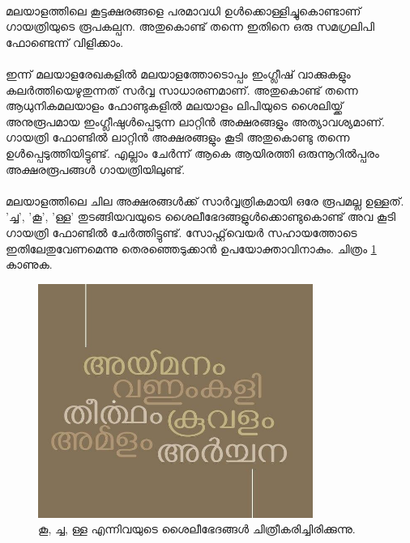 \documentclass[12pt]{report}
\begin{document}
	\paragraph{}
	മലയാളത്തിലെ കൂട്ടക്ഷരങ്ങളെ പരമാവധി ഉള്‍ക്കൊള്ളിച്ചുകൊണ്ടാണ് ഗായത്രിയുടെ രൂപകല്പന‍. അതുകൊണ്ട് തന്നെ ഇതിനെ ഒരു സമഗ്രലിപി ഫോണ്ടെന്ന് വിളിക്കാം.
	
	\paragraph{}
	ഇന്ന് മലയാളരേഖകളില്‍ മലയാളത്തോടൊപ്പം ഇംഗ്ലീഷ് വാക്കുകളും കലര്‍ത്തിയെഴുതുന്നത് സര്‍വ്വ സാധാരണമാണ്. അതുകൊണ്ട് തന്നെ ആധുനികമലയാളം ഫോണ്ടുകളില്‍ മലയാളം ലിപിയുടെ ശൈലിയ്ക്ക് അനുരൂപമായ ഇംഗ്ലീഷുള്‍പ്പെടുന്ന ലാറ്റിന്‍ അക്ഷരങ്ങളും അത്യാവശ്യമാണ്. ഗായത്രി ഫോണ്ടില്‍ ലാറ്റിന്‍ അക്ഷരങ്ങളും കൂടി അതുകൊണ്ടു തന്നെ ഉള്‍പ്പെടുത്തിയിട്ടുണ്ട്.  എല്ലാം ചേര്‍ന്ന് ആകെ ആയിരത്തി ഒരുന്നൂറിൽപ്പരം അക്ഷരരൂപങ്ങൾ‍ ഗായത്രിയിലുണ്ട്. 
	
	\paragraph{}
	മലയാളത്തിലെ ചില അക്ഷരങ്ങള്‍ക്ക് സാര്‍വ്വത്രികമായി ഒരേ രൂപമല്ല ഉള്ളത്. 'ച്ച', 'കൂ', 'ള്ള' തുടങ്ങിയവയുടെ ശൈലീഭേദങ്ങളുള്‍ക്കൊണ്ടുകൊണ്ട് അവ കൂടി ഗായത്രി ഫോണ്ടില്‍ ചേര്‍ത്തിട്ടുണ്ട്. സോഫ്റ്റ്‌വെയര്‍ സഹായത്തോടെ ഇതിലേതുവേണമെന്നു തെരഞ്ഞെടുക്കാന്‍ ഉപയോക്താവിനാകും. ചിത്രം \ref{style} കാണുക. 
	‍ 
	\begin{figure}
		\begin{centering}
			\includegraphics[width=0.8\textwidth]{style.jpg}
			\caption{കൂ, ച്ച, ള്ള എന്നിവയുടെ ശൈലീഭേദങ്ങൾ ചിത്രീകരിച്ചിരിക്കുന്നു.}
			\label{style}
		\end{centering}
	\end{figure}
	
\end{document}
